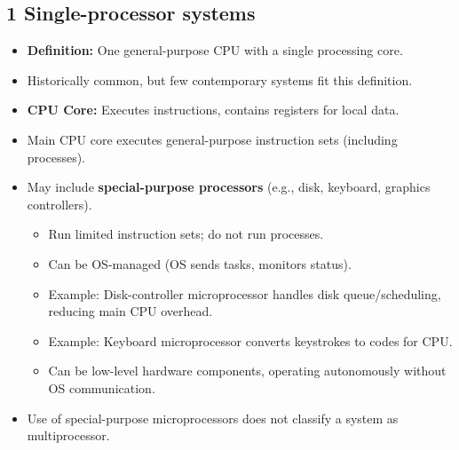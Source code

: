 \documentclass{article}
\begin{document}
\subsection*{1 Single-processor systems}
\begin{itemize}
    \item \textbf{Definition:} One general-purpose CPU with a single processing core.
    \item Historically common, but few contemporary systems fit this definition.
    \item \textbf{CPU Core:} Executes instructions, contains registers for local data.
    \item Main CPU core executes general-purpose instruction sets (including processes).
    \item May include \textbf{special-purpose processors} (e.g., disk, keyboard, graphics controllers).
    \begin{itemize}
        \item Run limited instruction sets; do not run processes.
        \item Can be OS-managed (OS sends tasks, monitors status).
        \item Example: Disk-controller microprocessor handles disk queue/scheduling, reducing main CPU overhead.
        \item Example: Keyboard microprocessor converts keystrokes to codes for CPU.
        \item Can be low-level hardware components, operating autonomously without OS communication.
    \end{itemize}
    \item Use of special-purpose microprocessors does not classify a system as multiprocessor.
\end{itemize}
\end{document}

